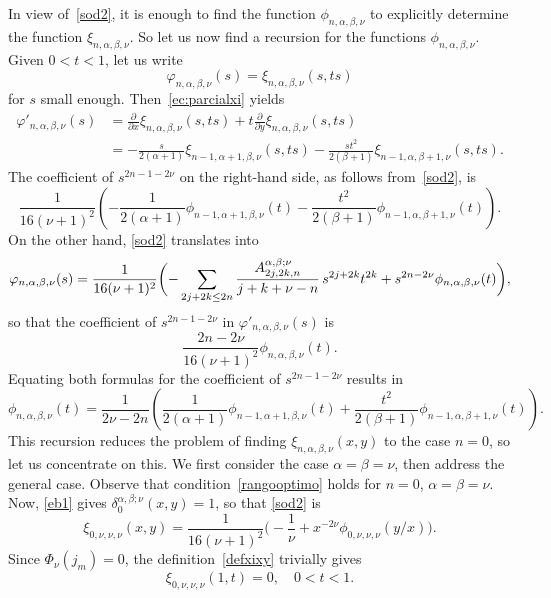 \documentclass[10pt,leqno,a4paper]{article}
\theoremstyle{plain}
\numberwithin{equation}{section}
\begin{document}
In view of~\eqref{sod2}, it is enough to find the function $\phi_{n,\alpha,\beta,\nu}$ to explicitly determine the function $\xi_{n,\alpha,\beta,\nu}$.
So let us now find a recursion for the functions $\phi_{n,\alpha,\beta,\nu}$. Given $0 < t < 1$, let us write
\[
   \varphi_{n,\alpha,\beta,\nu}(s)=\xi_{n,\alpha,\beta,\nu}(s,ts)
\]
for $s$ small enough.
Then~\eqref{ec:parcialxi} yields
\begin{align*}
   \varphi'_{n,\alpha,\beta,\nu}(s)
   &= \frac{\partial}{\partial x} \xi_{n,\alpha,\beta,\nu}(s,ts)
   + t \frac{\partial}{\partial y} \xi_{n,\alpha,\beta,\nu}(s,ts)
   \\
   &= - \frac{s}{2(\alpha+1)} \xi_{n-1,\alpha+1,\beta,\nu}(s,ts)
   - \frac{s t^2}{2(\beta+1)} \xi_{n-1,\alpha,\beta+1,\nu}(s,ts).
\end{align*}
The coefficient of $s^{2n-1-2\nu}$ on the right-hand side, as follows from~\eqref{sod2}, is
\[
   \frac{1}{16(\nu+1)^2} \left( - \frac{1}{2(\alpha+1)} \phi_{n-1,\alpha+1,\beta,\nu}(t)
   - \frac{t^2}{2(\beta+1)} \phi_{n-1,\alpha,\beta+1,\nu}(t) \right).
\]
On the other hand, \eqref{sod2} translates into
\[
   \varphi_{n,\alpha,\beta,\nu}(s)
   = \frac{1}{16(\nu+1)^2} \bigg(
   {-} \sum_{2j + 2k \leq 2n}
   \frac{A_{2j,2k,n}^{\alpha,\beta;\nu}}{j+k+\nu - n} \,s^{2j+2k} t^{2k}
   \\
   + s^{2n-2\nu} \phi_{n,\alpha,\beta,\nu}(t)
   \bigg),
\]
so that the coefficient of $s^{2n-1-2\nu}$ in $\varphi'_{n,\alpha,\beta,\nu}(s)$ is
\[
   \frac{2n-2\nu}{16(\nu+1)^2} \phi_{n,\alpha,\beta,\nu}(t).
\]
Equating both formulas for the coefficient of $s^{2n-1-2\nu}$ results in
\begin{equation}
\label{rdc}
   \phi_{n,\alpha,\beta,\nu}(t) = \frac{1}{2\nu-2n} \left(
   \frac{1}{2(\alpha+1)} \phi_{n-1,\alpha+1,\beta,\nu}(t)
   + \frac{t^2}{2(\beta+1)} \phi_{n-1,\alpha,\beta+1,\nu}(t)
   \right).
\end{equation}
This recursion reduces the problem of finding $\xi_{n,\alpha,\beta,\nu}(x,y)$ to the case $n=0$, so let us concentrate on this. We first consider the case $\alpha = \beta = \nu$, then address the general case. Observe that condition~\eqref{rangooptimo} holds for $n=0$, $\alpha = \beta = \nu$. Now, \eqref{eb1} gives $\delta_0^{\alpha,\beta;\nu}(x,y) = 1$, so that \eqref{sod2} is
\[
   \xi_{0,\nu,\nu,\nu}(x,y)
   = \frac{1}{16(\nu+1)^2} \bigg(
   {-} \frac{1}{\nu} + x^{-2\nu} \phi_{0,\nu,\nu,\nu}(y/x)
   \bigg).
\]
Since $\Phi_\nu(j_m) = 0$, the definition~\eqref{defxixy} trivially gives
\[
   \xi_{0,\nu,\nu,\nu}(1,t) = 0,
   \quad 0 < t < 1.
\]
\end{document}
